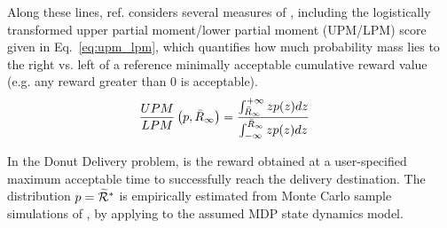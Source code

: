Along these lines, ref. \cite{Aitken2016-cv} considers several measures of \rwdopt, including the logistically transformed upper partial moment/lower partial moment (UPM/LPM) score given in Eq.~\ref{eq:upm_lpm}, which quantifies how much probability mass lies to the right vs. left of a reference minimally acceptable cumulative reward value \ris{} (e.g. any reward greater than 0 is acceptable).
    \begin{align}
        \frac{UPM}{LPM}\left(p,\riref\right) &= \frac{\int_{\riref}^{+\infty}zp(z)dz}{\int_{-\infty}^{\riref} zp(z)dz} \label{eq:upm_lpm}
    \end{align}

In the Donut Delivery problem, \riref{} is the reward obtained at a user-specified maximum acceptable time to successfully reach the delivery destination. The distribution $p = \widetilde{\mathcal{R}}^*$ is empirically estimated from Monte Carlo sample simulations of \rwdopt, by applying \piopt{} to the assumed MDP state dynamics model.

